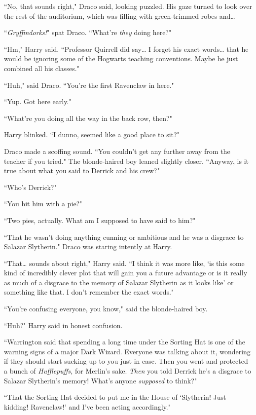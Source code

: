 ``No, that sounds right," Draco said, looking puzzled. His gaze turned to look over the rest of the auditorium, which was filling with green-trimmed robes and{\ldots}

``\emph{Gryffindorks!}" spat Draco. ``What're \emph{they} doing here?"

``Hm," Harry said. ``Professor Quirrell did say{\ldots} I forget his exact words{\ldots} that he would be ignoring some of the Hogwarts teaching conventions. Maybe he just combined all his classes."

``Huh," said Draco. ``You're the first Ravenclaw in here."

``Yup. Got here early."

``What're you doing all the way in the back row, then?"

Harry blinked. ``I dunno, seemed like a good place to sit?"

Draco made a scoffing sound. ``You couldn't get any further away from the teacher if you tried." The blonde-haired boy leaned slightly closer. ``Anyway, is it true about what you said to Derrick and his crew?"

``Who's Derrick?"

``You hit him with a pie?"

``Two pies, actually. What am I supposed to have said to him?"

``That he wasn't doing anything cunning or ambitious and he was a disgrace to Salazar Slytherin." Draco was staring intently at Harry.

``That{\ldots} sounds about right," Harry said. ``I think it was more like, `is this some kind of incredibly clever plot that will gain you a future advantage or is it really as much of a disgrace to the memory of Salazar Slytherin as it looks like' or something like that. I don't remember the exact words."

``You're confusing everyone, you know," said the blonde-haired boy.

``Huh?" Harry said in honest confusion.

``Warrington said that spending a long time under the Sorting Hat is one of the warning signs of a major Dark Wizard. Everyone was talking about it, wondering if they should start sucking up to you just in case. Then you went and protected a bunch of \emph{Hufflepuffs,} for Merlin's sake. \emph{Then} you told Derrick he's a disgrace to Salazar Slytherin's memory! What's anyone \emph{supposed} to think?"

``That the Sorting Hat decided to put me in the House of `Slytherin! Just kidding! Ravenclaw!' and I've been acting accordingly."

